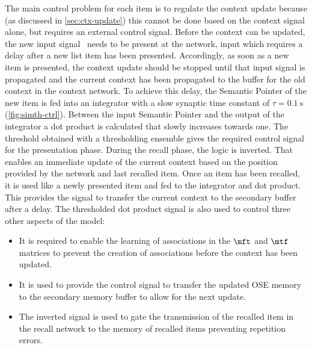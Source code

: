 The main control problem for each item is to regulate the context update because (as discussed in \cref{sec:ctx-update}) this cannot be done based on the context signal alone, but requires an external control signal.
Before the context can be updated, the new input signal \ctxin\ needs to be present at the network, input which requires a delay after a new list item has been presented.
Accordingly, as soon as a new item is presented, the context update should be stopped until that input signal is propagated and the current context has been propagated to the buffer for the old context in the context network.
To achieve this delay, the Semantic Pointer of the new item is fed into an integrator with a slow synaptic time constant of $\tau = \SI{0.1}{\second}$ (\cref{fig:simth-ctrl}).
Between the input Semantic Pointer and the output of the integrator a dot product is calculated that slowly increases towards one.
The threshold obtained with a thresholding ensemble gives the required control signal for the presentation phase.
During the recall phase, the logic is inverted.
That enables an immediate update of the current context based on the position provided by the  network and last recalled item.
Once an item has been recalled, it is used like a newly presented item and fed to the integrator and dot product.
This provides the signal to transfer the current context to the secondary buffer after a delay.
The thresholded dot product signal is also used to control three other aspects of the model:
\begin{itemize}
    \item It is required to enable the learning of associations in the $\mft$ and $\mtf$ matrices to prevent the creation of associations before the context has been updated.
    \item It is used to provide the control signal to transfer the updated OSE memory to the secondary memory buffer to allow for the next update.
    \item The inverted signal is used to gate the transmission of the recalled item in the recall network to the memory of recalled items preventing repetition errors.
\end{itemize}
